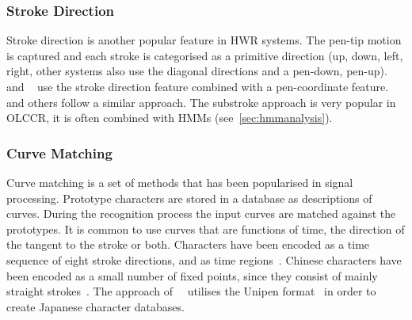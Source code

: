 \subsubsection{Stroke Direction}
\label{sec:strokedirection}
Stroke direction is another popular feature in HWR systems. The pen-tip motion
is captured and each stroke is categorised as a primitive direction (up, down, 
left, right, other systems also use the diagonal directions and a pen-down, 
pen-up). ~\citeyear{Nakai2001} and 
~\citeyear{Tokuno2002} use the stroke 
direction feature combined with a pen-coordinate feature. 
~\citeyear{Okumura2005} and others follow 
a similar approach. The substroke approach is very popular in OLCCR, 
it is often combined with HMMs (see~\ref{sec:hmmanalysis}).

\subsubsection{Curve Matching}
\label{sec:curvematching}

Curve matching is a set of methods that has been popularised in signal 
processing. Prototype characters are stored in a database as descriptions 
of curves. During the recognition process the input curves are matched against 
the prototypes. It is common to use curves that are functions of time, 
the direction of the tangent to the stroke or both. Characters have been 
encoded as a time sequence of eight stroke directions, and as time 
regions~. Chinese characters have been encoded as a 
small number of fixed points, since they consist of mainly straight 
strokes~. The approach 
of~~\citeyear{Jaeger2001a} utilises the Unipen 
format~ in order to create Japanese character 
databases.

